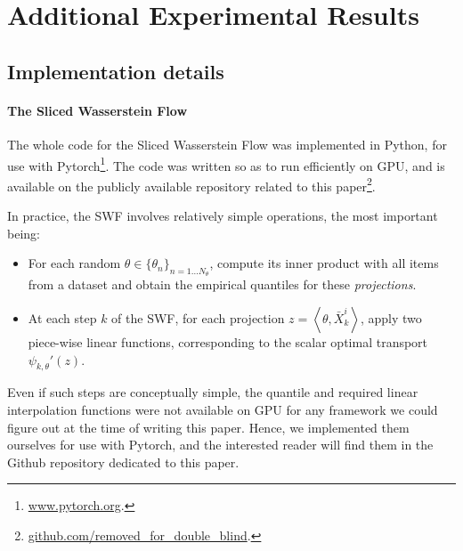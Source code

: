 





\section{Additional Experimental Results}

\subsection{Implementation details}

\paragraph{The Sliced Wasserstein Flow}
The whole code for the Sliced Wasserstein Flow was implemented in Python, for use with Pytorch\footnote{\url{www.pytorch.org}.}. The code was written so as to run efficiently on GPU, and is available on the publicly available repository related to this paper\footnote{\url{github.com/removed_for_double_blind}.}.

In practice, the SWF involves relatively simple operations, the most important being:
\begin{itemize}
  \item For each random $\theta\in\{\theta_n\}_{n=1\dots N_\theta}$,  compute its inner product with all items from a dataset and obtain the empirical quantiles for these \emph{projections}.
  \item At each step $k$ of the SWF, for each projection $z=\left<\theta, \bar{X}^i_k\right>$, apply two piece-wise linear functions, corresponding to the scalar optimal transport $\psi_{k, \theta}'(z)$.
\end{itemize}
Even if such steps are conceptually simple, the quantile and required linear interpolation functions were not available on GPU for any framework we could figure out at the time of writing this paper. Hence, we implemented them ourselves for use with Pytorch, and the interested reader will find them in the Github repository dedicated to this paper.

